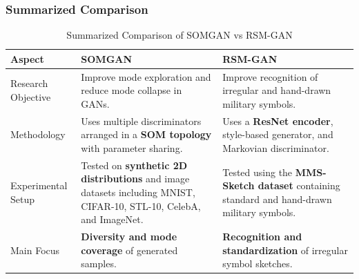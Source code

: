 \documentclass[12pt,a4paper]{article}
\begin{document}
\subsubsection{Summarized Comparison}
\begin{table}[H]
\caption{Summarized Comparison of SOMGAN vs RSM-GAN}
\label{tab:somgan-rsmgan}

\fontsize{10pt}{12pt}\selectfont

\begin{tabular}{|p{3.2cm}|p{5cm}|p{5cm}|}
\hline
\centering\textbf{Aspect} &
\centering\textbf{SOMGAN} &
\centering\textbf{RSM-GAN}
\tabularnewline
\hline

\centering Research Objective &
Improve mode exploration and reduce mode collapse in GANs. &
Improve recognition of irregular and hand-drawn military symbols.
\tabularnewline 
\hline

\centering Methodology &
Uses multiple discriminators arranged in a \textbf{SOM topology} with parameter sharing. &
Uses a \textbf{ResNet encoder}, style-based generator, and Markovian discriminator.
\tabularnewline
\hline

\centering Experimental Setup &
Tested on \textbf{synthetic 2D distributions} and image datasets including MNIST, CIFAR-10, STL-10, CelebA, and ImageNet. &
Tested using the \textbf{MMS-Sketch dataset} containing standard and hand-drawn military symbols.
\tabularnewline
\hline

\centering Main Focus &
\textbf{Diversity and mode coverage} of generated samples. &
\textbf{Recognition and standardization} of irregular symbol sketches.
\tabularnewline
\hline

\end{tabular}

\end{table}
\end{document}
